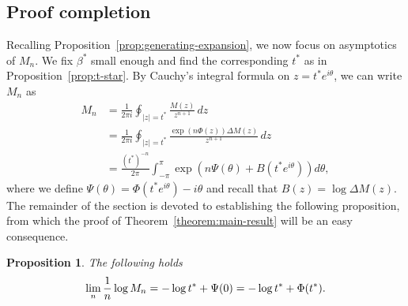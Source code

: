 \documentclass[12pt]{article}
\newtheorem{proposition}[theorem]{Proposition}
\begin{document}
\subsection{Proof completion}

Recalling  Proposition~\ref{prop:generating-expansion},
we now focus on asymptotics of $M_n$. We fix $\beta^*$ small enough and find the corresponding $t^*$ as in Proposition~\ref{prop:t-star}. 
By Cauchy's integral formula on $z=t^* e^{i\theta}$, we can write $M_n$ as
	\begin{align*}
		M_n &= \frac{1}{2\pi i}\oint_{|z|=t^*}\frac{M(z)}{z^{n+1}}\,dz \\
		&=\frac{1}{2\pi i}\oint_{|z|=t^*}\frac{\exp(n\Phi(z))\Delta M(z)}{z^{n+1}}\,dz \\
		&= \frac{(t^*)^{-n}}{2\pi}\int_{-\pi}^\pi \exp\left(n \Psi(\theta) + B(t^*e^{i\theta})\right)d\theta,
	\end{align*}
where we define $\Psi(\theta) = \Phi(t^*e^{i\theta}) - i\theta$ and recall that $B(z)=\log \Delta M(z)$. 
The remainder of the section is devoted to establishing the following proposition, from which the proof of Theorem~\ref{theorem:main-result} 
will be an easy consequence.
\begin{proposition}\label{prop:M_n}
The following holds
\begin{align*}
\lim_n {1\over n}\log M_{n}=-\log t^*+\Psi(0)=-\log t^*+\Phi(t^*).
\end{align*}
\end{proposition}
\end{document}
